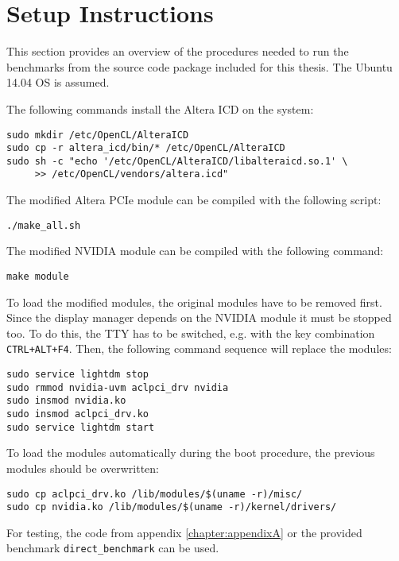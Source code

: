 \chapter{Setup Instructions}

\label{chapter:appendixB}


This section provides an overview of the procedures needed to run the benchmarks from the source code package included for this thesis.
The Ubuntu 14.04 OS is assumed.


The following commands install the Altera ICD on the system:
\begin{lstlisting}[label={}, caption={}]
sudo mkdir /etc/OpenCL/AlteraICD
sudo cp -r altera_icd/bin/* /etc/OpenCL/AlteraICD
sudo sh -c "echo '/etc/OpenCL/AlteraICD/libalteraicd.so.1' \
     >> /etc/OpenCL/vendors/altera.icd"
\end{lstlisting}

The modified Altera PCIe module can be compiled with the following script:
\begin{lstlisting}[label={}, caption={}]
./make_all.sh
\end{lstlisting}

The modified NVIDIA module can be compiled with the following command:
\begin{lstlisting}[label={}, caption={}]
make module
\end{lstlisting}

To load the modified modules, the original modules have to be removed first.
Since the display manager depends on the NVIDIA module it must be stopped too.
To do this, the TTY has to be switched, e.g. with the key combination \texttt{CTRL+ALT+F4}.
Then, the following command sequence will replace the modules:
\begin{lstlisting}[label={}, caption={}]
sudo service lightdm stop
sudo rmmod nvidia-uvm aclpci_drv nvidia
sudo insmod nvidia.ko
sudo insmod aclpci_drv.ko
sudo service lightdm start
\end{lstlisting}

To load the modules automatically during the boot procedure, the previous modules should be overwritten:
\begin{lstlisting}[label={}, caption={}]
sudo cp aclpci_drv.ko /lib/modules/$(uname -r)/misc/
sudo cp nvidia.ko /lib/modules/$(uname -r)/kernel/drivers/
\end{lstlisting}

For testing, the code from appendix \ref{chapter:appendixA} or the provided benchmark \texttt{direct\_benchmark} can be used.


